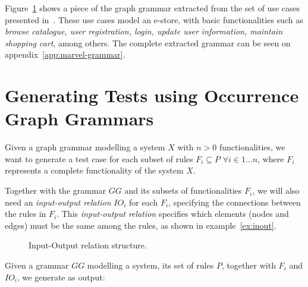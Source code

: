 Figure~\ref{} shows a piece of the graph grammar extracted from the set of use cases presented in~\cite{Goins2007}. These use cases model an e-store, with basic functionalities such as \emph{browse catalogue, user registration, login, update user information, maintain shopping cart}, among others. The complete extracted grammar can be seen on appendix~\ref{app:marvel-grammar}.

\section{Generating Tests using Occurrence Graph Grammars}

Given a graph grammar \graphGrammar{} modelling a system $X$ with $n > 0$ functionalities, we want to generate a test case for each subset of rules $F_i \subseteq P$ $\forall i \in 1\ldots n$, where $F_i$ represents a complete functionality  of the system $X$.

Together with the grammar $GG$ and its subsets of functionalities $F_i$, we will also need an \emph{input-output relation} $IO_i$ for each $F_i$, specifying the connections between the rules in $F_i$. This \emph{input-output relation} specifies which elements (nodes and edges) must be the same among the rules, as shown in example~\ref{ex:inout}.

\begin{example}\label{ex:inout}


\begin{figure}[!ht]
  \centering
  \caption{Input-Output relation structure.}\label{fig:tests:inout}
\end{figure}

\end{example}

Given a grammar $GG$ modelling a system, its set of rules $P$, together with $F_i$ and $IO_i$, we generate as output:

